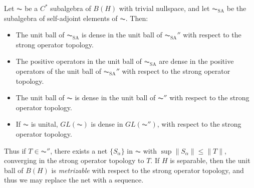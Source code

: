 \begin{theorem}
    Let $\AC$ be a $C^*$ subalgebra of $B(H)$ with trivial nullspace, and let $\AC_{\text{SA}}$ be the subalgebra of self-adjoint elements of $\AC$. Then:
    \begin{itemize}
        \item The unit ball of $\AC_{\text{SA}}$ is dense in the unit ball of $\AC_{\text{SA}}''$ with respect to the strong operator topology.
        \item The positive operators in the unit ball of $\AC_{\text{SA}}$ are dense in the positive operators of the unit ball of $\AC_{\text{SA}}''$ with respect to the strong operator topology.
        \item The unit ball of $\AC$ is dense in the unit ball of $\AC''$ with respect to the strong operator topology.
        \item If $\AC$ is unital, $GL(\AC)$ is dense in $GL(\AC'')$, with respect to the strong operator topology.
    \end{itemize}
    Thus if $T \in \AC''$, there exists a net $\{ S_\alpha \}$ in $\AC$ with $\sup \| S_\alpha \| \leq \| T \|$, converging in the strong operator topology to $T$. If $H$ is separable, then the unit ball of $B(H)$ is \emph{metrizable} with respect to the strong operator topology, and thus we may replace the net with a sequence.
\end{theorem}
